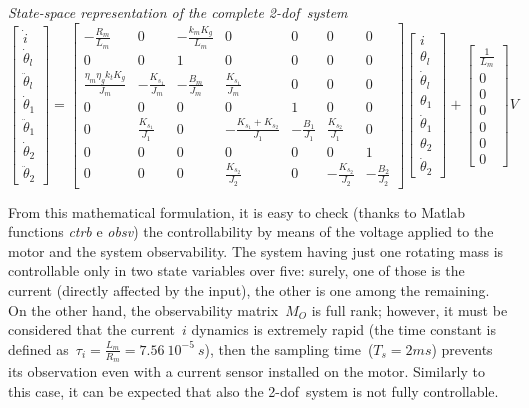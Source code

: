 \noindent \textit{State-space representation of the complete \acrshort{2-dof}\ system}
\begin{equation}
	\begin{bmatrix}
		\dot{i} \\
		\dot{\theta}_l \\
		\ddot{\theta}_l \\
		\dot{\theta}_1 \\
		\ddot{\theta}_1 \\
		\dot{\theta}_2 \\
		\ddot{\theta}_2
	\end{bmatrix}
	=
	\begin{bmatrix}
		-\frac{R_m}{L_m} & 0 & -\frac{k_m K_g}{L_m} & 0 & 0 & 0 & 0 \\
		0 & 0 &1 & 0 & 0 & 0 & 0 \\
		\frac{\eta_m \eta_g k_t K_g}{J_m} & -\frac{K_{s_1}}{J_m} & -\frac{B_m}{J_m} & \frac{K_{s_1}}{J_m} & 0 & 0 & 0 \\
		0 & 0 & 0 & 0 & 1 & 0 & 0 \\
		0 & \frac{K_{s_1}}{J_1} & 0 & -\frac{K_{s_1}+K_{s_2}}{J_1} & -\frac{B_1}{J_1} & \frac{K_{s_2}}{J_1} & 0 \\
		0 & 0 & 0 & 0 & 0 & 0 & 1 \\
		0 & 0 & 0 & \frac{K_{s_2}}{J_2} & 0 & -\frac{K_{s_2}}{J_2} & -\frac{B_2}{J_2}
	\end{bmatrix}
	\begin{bmatrix}
		i \\
		\theta_l \\
		\dot{\theta}_l \\
		\theta_1 \\
		\dot{\theta}_1 \\
		\theta_2 \\
		\dot{\theta}_2
	\end{bmatrix}
	+
	\begin{bmatrix}
		\frac{1}{L_m} \\
		0 \\
		0 \\
		0 \\
		0 \\
		0 \\
		0
	\end{bmatrix}
	V
\end{equation}

From this mathematical formulation, it is easy to check (thanks to Matlab functions  \textit{ctrb} e \textit{obsv}) the controllability by means of the voltage applied to the motor and the system observability.
The system having just one rotating mass is controllable only in two state variables over five: surely, one of those is the current (directly affected by the input), the other is one among the remaining. On the other hand, the observability matrix~$M_O$ is full rank; however, it must be considered that the current~$i$ dynamics is extremely rapid (the time constant is defined as~$\tau_i = \frac{L_m}{R_m} = 7.56\ 10^{-5} \ s$), then the sampling time~($T_s = 2 ms$) prevents its observation even with a current sensor installed on the motor.
Similarly to this case, it can be expected that also the \acrshort{2-dof}\ system is not fully controllable. \\

